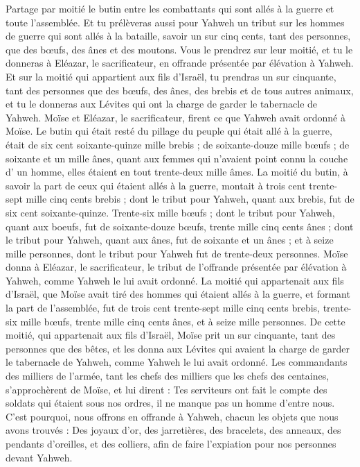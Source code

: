 \begin{multicols}{2}
Partage par moitié le butin entre les combattants qui sont allés à la guerre et toute l'assemblée.
Et tu prélèveras aussi pour Yahweh un tribut sur les hommes de guerre qui sont allés à la bataille, savoir un sur cinq cents, tant des personnes, que des bœufs, des ânes et des moutons.
Vous le prendrez sur leur moitié, et tu le donneras à Eléazar, le sacrificateur, en offrande présentée par élévation à Yahweh.
Et sur la moitié qui appartient aux fils d'Israël, tu prendras un sur cinquante, tant des personnes que des bœufs, des ânes, des brebis et de tous autres animaux, et tu le donneras aux Lévites qui ont la charge de garder le tabernacle de Yahweh.
Moïse et Eléazar, le sacrificateur, firent ce que Yahweh avait ordonné à Moïse.
Le butin qui était resté du pillage du peuple qui était allé à la guerre, était de six cent soixante-quinze mille brebis ;
de soixante-douze mille bœufs ;
de soixante et un mille ânes,
quant aux femmes qui n'avaient point connu la couche d' un homme, elles étaient en tout trente-deux mille âmes.
La moitié du butin, à savoir la part de ceux qui étaient allés à la guerre, montait à trois cent trente-sept mille cinq cents brebis ;
dont le tribut pour Yahweh, quant aux brebis, fut de six cent soixante-quinze.
Trente-six mille bœufs ; dont le tribut pour Yahweh, quant aux boeufs, fut de soixante-douze bœufs,
trente mille cinq cents ânes ; dont le tribut pour Yahweh, quant aux ânes, fut de soixante et un ânes ;
et à seize mille personnes, dont le tribut pour Yahweh fut de trente-deux personnes.
Moïse donna à Eléazar, le sacrificateur, le tribut de l'offrande présentée par élévation à Yahweh, comme Yahweh le lui avait ordonné.
La moitié qui appartenait aux fils d'Israël, que Moïse avait tiré des hommes qui étaient allés à la guerre,
et formant la part de l'assemblée, fut de trois cent trente-sept mille cinq cents brebis,
trente-six mille bœufs,
trente mille cinq cents ânes,
et à seize mille personnes.
De cette moitié, qui appartenait aux fils d'Israël, Moïse prit un sur cinquante, tant des personnes que des bêtes, et les donna aux Lévites qui avaient la charge de garder le tabernacle de Yahweh, comme Yahweh le lui avait ordonné.
Les commandants des milliers de l'armée, tant les chefs des milliers que les chefs des centaines, s'approchèrent de Moïse,
et lui dirent : Tes serviteurs ont fait le compte des soldats qui étaient sous nos ordres, il ne manque pas un homme d’entre nous.
C'est pourquoi, nous offrons en offrande à Yahweh, chacun les objets que nous avons trouvés : Des joyaux d'or, des jarretières, des bracelets, des anneaux, des pendants d'oreilles, et des colliers, afin de faire l’expiation pour nos personnes devant Yahweh.

\end{multicols}

